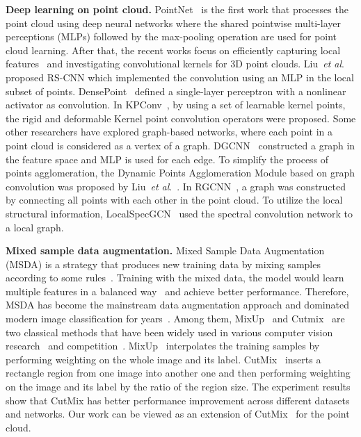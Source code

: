 \documentclass{article}
\newcommand{\etal}{\textit{et al}.}
\begin{document}
\textbf{Deep learning on point cloud.}
PointNet~\cite{pointnet} is the first work that processes the point cloud using deep neural networks where the shared pointwise multi-layer perceptions (MLPs) followed by the max-pooling operation are used for point cloud learning. After that, the recent works focus on efficiently capturing local features~\cite{pointnet++,pointasnl,pointweb,modelingpl} and investigating convolutional kernels for 3D point clouds. 
Liu~\etal~\cite{rscnn} proposed RS-CNN which implemented the convolution using an MLP in the local subset of points. DensePoint~\cite{densepoint} defined a single-layer perceptron with a nonlinear activator as convolution. In KPConv~\cite{kpconv}, by using a set of learnable kernel points, the rigid and deformable Kernel point convolution operators were proposed. 
Some other researchers have explored graph-based networks, where each point in a point cloud is considered as a vertex of a graph. DGCNN~\cite{dgcnn} constructed a graph in the feature space and MLP is used for each edge. To simplify the process of points agglomeration, the Dynamic Points Agglomeration Module based on graph convolution was proposed by Liu~\etal~\cite{dynamicPM}. In RGCNN~\cite{rgcnn}, a graph was constructed by connecting all points with each other in the point cloud. To utilize the local structural information, LocalSpecGCN~\cite{localgcn} used the spectral convolution network to a local graph.




\textbf{Mixed sample data augmentation.} 
Mixed Sample Data Augmentation (MSDA) is a strategy that produces new training data by mixing samples according to some rules~\cite{fmix}. Training with the mixed data, the model would learn multiple features in a balanced way~\cite{point_mask} and achieve better performance. Therefore, MSDA has become the mainstream data augmentation approach and dominated modern image classification for years~\cite{fmix,mixup_local,mixup,cutmix,manifold}.
Among them, MixUp~\cite{mixup} and Cutmix~\cite{cutmix} are two classical methods that have been widely used in various computer vision research~\cite{bagcnn} and competition~\cite{deepfake}.
MixUp~\cite{mixup} interpolates the training samples by performing weighting on the whole image and its label.
CutMix~\cite{cutmix} inserts a rectangle region from one image into another one and then performing weighting on the image and its label by the ratio of the region size.
The experiment results show that CutMix has better performance improvement across different datasets and networks. 
Our work can be viewed as an extension of CutMix~\cite{cutmix} for the point cloud.
\end{document}
